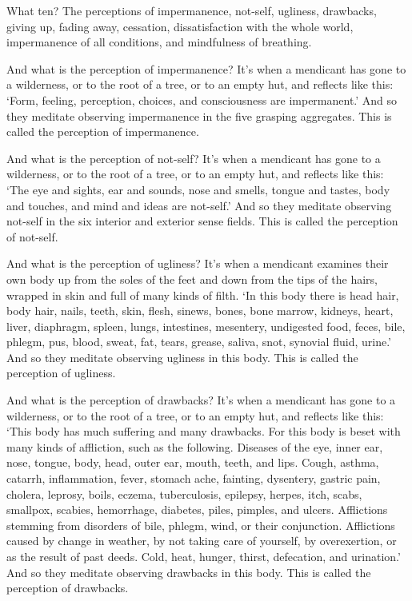 \documentclass[12pt,openany]{book}%
\begin{document}
What ten? The perceptions of impermanence, not-self, ugliness, drawbacks, giving up, fading away, cessation, dissatisfaction with the whole world, impermanence of all conditions, and mindfulness of breathing. 

And what is the perception of impermanence? It’s when a mendicant has gone to a wilderness, or to the root of a tree, or to an empty hut, and reflects like this: ‘Form, feeling, perception, choices, and consciousness are impermanent.’ And so they meditate observing impermanence in the five grasping aggregates. This is called the perception of impermanence. 

And what is the perception of not-self? It’s when a mendicant has gone to a wilderness, or to the root of a tree, or to an empty hut, and reflects like this: ‘The eye and sights, ear and sounds, nose and smells, tongue and tastes, body and touches, and mind and ideas are not-self.’ And so they meditate observing not-self in the six interior and exterior sense fields. This is called the perception of not-self. 

And what is the perception of ugliness? It’s when a mendicant examines their own body up from the soles of the feet and down from the tips of the hairs, wrapped in skin and full of many kinds of filth. ‘In this body there is head hair, body hair, nails, teeth, skin, flesh, sinews, bones, bone marrow, kidneys, heart, liver, diaphragm, spleen, lungs, intestines, mesentery, undigested food, feces, bile, phlegm, pus, blood, sweat, fat, tears, grease, saliva, snot, synovial fluid, urine.’ And so they meditate observing ugliness in this body. This is called the perception of ugliness. 

And what is the perception of drawbacks? It’s when a mendicant has gone to a wilderness, or to the root of a tree, or to an empty hut, and reflects like this: ‘This body has much suffering and many drawbacks. For this body is beset with many kinds of affliction, such as the following. Diseases of the eye, inner ear, nose, tongue, body, head, outer ear, mouth, teeth, and lips. Cough, asthma, catarrh, inflammation, fever, stomach ache, fainting, dysentery, gastric pain, cholera, leprosy, boils, eczema, tuberculosis, epilepsy, herpes, itch, scabs, smallpox, scabies, hemorrhage, diabetes, piles, pimples, and ulcers. Afflictions stemming from disorders of bile, phlegm, wind, or their conjunction. Afflictions caused by change in weather, by not taking care of yourself, by overexertion, or as the result of past deeds. Cold, heat, hunger, thirst, defecation, and urination.’ And so they meditate observing drawbacks in this body. This is called the perception of drawbacks. 
\end{document}
